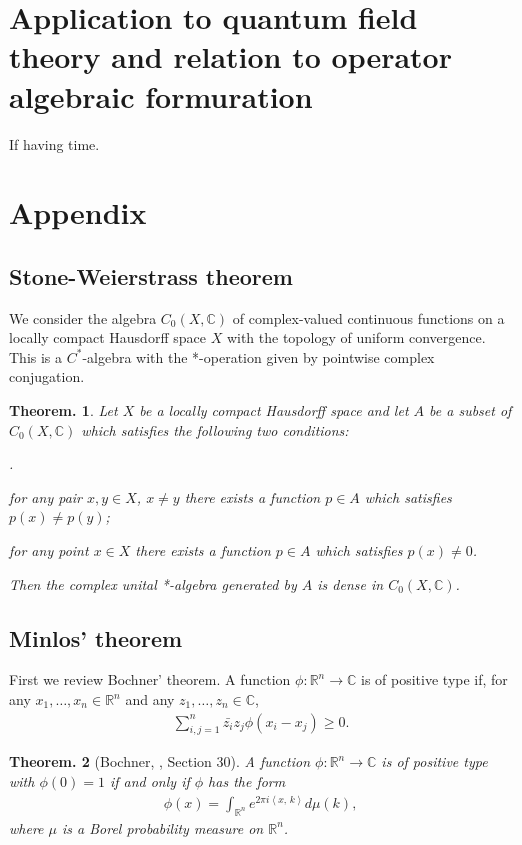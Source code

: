 \documentclass[openany, a4paper, oneside]{book}
\newcounter{enum2}
\renewenvironment{enumerate}{%
\begin{list}%
{%
\arabic{enum2}.\ \,%
}%
{%
\usecounter{enum2}
\setlength{\itemindent}{0pt}%
\setlength{\leftmargin}{6pt}%
\setlength{\rightmargin}{0pt}%
\setlength{\labelsep}{0pt}%
\setlength{\labelwidth}{6pt}%
\setlength{\itemsep}{0pt}%
\setlength{\parsep}{0pt}%
\setlength{\listparindent}{0pt}%
}
}{%
\end{list}%
}
\theoremstyle{break}
\newtheorem{thm}{Theorem.}[section]
\theoremstyle{breakdefn}
\newcommand{\bkt}[2]{\left\langle#1,\,#2\right\rangle}
\newcommand{\bbC}{\mathbb{C}}
\newcommand{\bbRn}{\mathbb{R}^n}
\begin{document}
\section{Application to quantum field theory and relation to operator algebraic formuration}
\label{sec-8-2-4}

If having time.
\section{Appendix}
\label{sec-8-2-5}
\subsection{Stone-Weierstrass theorem}
\label{sec-8-2-5-1}

We consider the algebra $C_0 (X, \bbC)$ of complex-valued continuous functions on
a locally compact Hausdorff space $X$ with the topology of uniform convergence.
This is a $C^*$-algebra with the *-operation given by pointwise complex conjugation.
\begin{thm}
 Let $X$ be a locally compact Hausdorff space and let $A$ be a subset of $C_0 (X, \bbC)$ which satisfies the following two conditions:
\begin{enumerate}
\item for any pair $x, y \in X$, $x \neq y$ there exists a function $p \in A$ which satisfies $p (x) \neq p (y)$;
\item for any point $x \in X$ there exists a function $p \in A$ which satisfies $p (x) \neq 0$.
\end{enumerate}
 Then the complex unital *-algebra generated by $A$ is dense in $C_0 (X, \bbC)$.
\end{thm}
\subsection{Minlos' theorem}
\label{sec-8-2-5-2}

First we review Bochner' theorem.
A function $\phi \colon \bbRn \to \bbC$ is of positive type if, for any $x_1, \dots, x_n \in \bbRn$ and any $z_1, \dots, z_n \in \bbC$,
\begin{align}
 \sum_{i,j=1}^n \bar{z_i} z_j \phi (x_i - x_j) \geq 0.
\end{align}
\begin{thm}[Bochner, \cite{SeizoIto1}, Section 30]
 A function $\phi \colon \bbRn \to \bbC$ is of positive type with $\phi (0) = 1$ if and only if $\phi$ has the form
 \begin{align}
  \phi (x)
  =
  \int_{\bbRn} e^{2 \pi i \bkt{x}{k}} d \mu (k),
 \end{align}
 where $\mu$ is a Borel probability measure on $\bbRn$.
\end{thm}
\end{document}
